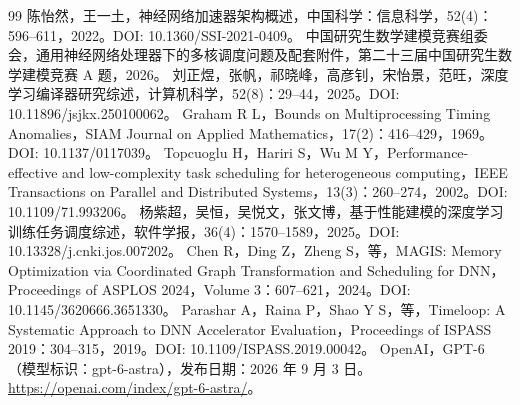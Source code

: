 \begin{thebibliography}{99}
 陈怡然，王一土，神经网络加速器架构概述，中国科学：信息科学，52(4)：596--611，2022。DOI: 10.1360/SSI-2021-0409。
 中国研究生数学建模竞赛组委会，通用神经网络处理器下的多核调度问题及配套附件，第二十三届中国研究生数学建模竞赛 A 题，2026。
 刘正煜，张帆，祁晓峰，高彦钊，宋怡景，范旺，深度学习编译器研究综述，计算机科学，52(8)：29--44，2025。DOI: 10.11896/jsjkx.250100062。
 Graham R L，Bounds on Multiprocessing Timing Anomalies，SIAM Journal on Applied Mathematics，17(2)：416--429，1969。DOI: 10.1137/0117039。
 Topcuoglu H，Hariri S，Wu M Y，Performance-effective and low-complexity task scheduling for heterogeneous computing，IEEE Transactions on Parallel and Distributed Systems，13(3)：260--274，2002。DOI: 10.1109/71.993206。
 杨紫超，吴恒，吴悦文，张文博，基于性能建模的深度学习训练任务调度综述，软件学报，36(4)：1570--1589，2025。DOI: 10.13328/j.cnki.jos.007202。
 Chen R，Ding Z，Zheng S，等，MAGIS: Memory Optimization via Coordinated Graph Transformation and Scheduling for DNN，Proceedings of ASPLOS 2024，Volume 3：607--621，2024。DOI: 10.1145/3620666.3651330。
 Parashar A，Raina P，Shao Y S，等，Timeloop: A Systematic Approach to DNN Accelerator Evaluation，Proceedings of ISPASS 2019：304--315，2019。DOI: 10.1109/ISPASS.2019.00042。
 OpenAI，GPT-6（模型标识：gpt-6-astra），发布日期：2026 年 9 月 3 日。\url{https://openai.com/index/gpt-6-astra/}。
\end{thebibliography}
